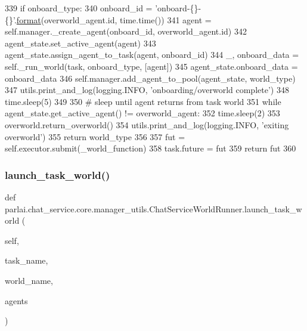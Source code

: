 \begin{DoxyCode}
339                 \textcolor{keywordflow}{if} onboard\_type:
340                     onboard\_id = \textcolor{stringliteral}{'onboard-\{\}-\{\}'}.\hyperlink{namespaceparlai_1_1chat__service_1_1services_1_1messenger_1_1shared__utils_a32e2e2022b824fbaf80c747160b52a76}{format}(overworld\_agent.id, time.time())
341                     agent = self.manager.\_create\_agent(onboard\_id, overworld\_agent.id)
342                     agent\_state.set\_active\_agent(agent)
343                     agent\_state.assign\_agent\_to\_task(agent, onboard\_id)
344                     \_, onboard\_data = self.\_run\_world(task, onboard\_type, [agent])
345                     agent\_state.onboard\_data = onboard\_data
346                 self.manager.add\_agent\_to\_pool(agent\_state, world\_type)
347                 utils.print\_and\_log(logging.INFO, \textcolor{stringliteral}{'onboarding/overworld complete'})
348                 time.sleep(5)
349 
350                 \textcolor{comment}{# sleep until agent returns from task world}
351                 \textcolor{keywordflow}{while} agent\_state.get\_active\_agent() != overworld\_agent:
352                     time.sleep(2)
353                 overworld.return\_overworld()
354             utils.print\_and\_log(logging.INFO, \textcolor{stringliteral}{'exiting overworld'})
355             \textcolor{keywordflow}{return} world\_type
356 
357         fut = self.executor.submit(\_world\_function)
358         task.future = fut
359         \textcolor{keywordflow}{return} fut
360 \end{DoxyCode}
\mbox{\label{classparlai_1_1chat__service_1_1core_1_1manager__utils_1_1ChatServiceWorldRunner_ac6b8bd46cafa3ce7a5a74f4c1c35b8a8}} 
\subsubsection{\texorpdfstring{launch\+\_\+task\+\_\+world()}{launch\_task\_world()}}
{\footnotesize\ttfamily def parlai.\+chat\+\_\+service.\+core.\+manager\+\_\+utils.\+Chat\+Service\+World\+Runner.\+launch\+\_\+task\+\_\+world (\begin{DoxyParamCaption}\item[{}]{self,  }\item[{}]{task\+\_\+name,  }\item[{}]{world\+\_\+name,  }\item[{}]{agents }\end{DoxyParamCaption})}

